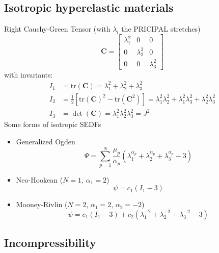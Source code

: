 \documentclass[../main.tex]{subfiles}
\begin{document}
\subsection{Isotropic hyperelastic materials}

Right Cauchy-Green Tensor (with $\lambda_i$ the PRICIPAL stretches)
\begin{equation}
    \textbf{C} = \left[\begin{matrix}
        \lambda_1^2 & 0 & 0 \\
        0 & \lambda_2^2 & 0 \\
        0 & 0 & \lambda_3^2
    \end{matrix}\right]
\end{equation}
with invariants:
\begin{align}
    I_1 & = \text{tr}(\textbf{C}) = \lambda_1^2 + \lambda_2^2 + \lambda_3^2\\
    I_2 & = \frac{1}{2}[\text{tr}(\textbf{C})^2 - \text{tr}(\textbf{C}^2)] = \lambda_1^2\lambda_2^2 + \lambda_1^2\lambda_3^2 + \lambda_2^2\lambda_3^2 \\
    I_3 & = \det(\textbf{C}) = \lambda_1^2\lambda_2^2\lambda_3^2 = J^2
\end{align}
Some forms of isotropic SEDFs
\begin{itemize}
    \item Generalized Ogden
    \begin{equation}
        \Psi = \sum^N_{p=1}\frac{\mu_p}{\alpha_p}(\lambda_1^{\alpha_p} + \lambda_2^{\alpha_p} + \lambda_3^{\alpha_p} - 3)
    \end{equation}
    \item Neo-Hookean ($N=1$, $\alpha_1=2$)
    \begin{equation}
        \psi = c_1(I_1 - 3)
    \end{equation}
    \item Mooney-Rivlin ($N = 2$, $\alpha_1=2$, $\alpha_2=-2$)
    \begin{equation}
        \psi = c_1(I_1 - 3) + c_2(\lambda_1^{-2} + \lambda_2^{-2} + \lambda_3^{-2} - 3)
    \end{equation}
\end{itemize}

\subsection{Incompressibility}
\end{document}
